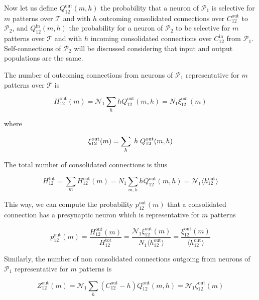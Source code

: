 \documentclass[a4paper, 12pt, twoside, openright]{book}
\newcommand{\popI}{\mathcal{P}_1}
\newcommand{\popII}{\mathcal{P}_2}
\newcommand{\NI}{\mathcal{N}_1}
\newcommand{\T}{\mathcal{T}}
\begin{document}
Now let us define $Q_{12}^\text{out}(m,h)$ the probability that a neuron of $\popI$ is selective for $m$ patterns over $\T$ and with $h$ outcoming consolidated connections over $C_{12}^\text{out}$ to $\popII$, and $Q_{12}^\text{in}(m,h)$ the probability for a neuron of $\popII$ to be selective for $m$ patterns over $\T$ and with $h$ incoming consolidated connections over $C_{12}^\text{in}$ from $\popI$. Self-connections of $\popII$ will be discussed considering that input and output populations are the same.

The number of outcoming connections from neurons of $\popI$ representative for $m$ patterns over $\T$ is

\begin{equation}
     H_{12}^\text{out}(m) = \NI \sum_{h} h Q_{12}^\text{out}(m,h)
     = N_1 \xi_{12}^\text{out} (m) 
\end{equation}

where

\begin{equation}
\xi_{12}^\text{out} (m) = 
 \sum_{h} \hspace{1mm}  h \hspace{1mm} Q_{12}^\text{out}(m,h)
\end{equation}

The total number of consolidated connections is thus

\begin{equation}
     H_{12}^\text{tot} = \sum_{m} H_{12}^\text{out}(m) = N_1 \sum_{m,h} h  Q_{12}^\text{out}(m,h) = \NI \langle h_{12}^\text{out} \rangle
\end{equation}

This way, we can compute the probability $p_{12}^\text{out}(m)$ that a consolidated connection has a presynaptic neuron which is representative for $m$ patterns

\begin{equation}
    p_{12}^\text{out}(m) = \frac{H_{12}^\text{out}(m)}{H_{12}^\text{tot}} =
    \frac{\NI \xi_{12}^\text{out} (m)}{N_1 \langle h_{12}^\text{out} \rangle}= \frac{\xi_{12}^\text{out} (m)}{\langle h_{12}^\text{out} \rangle}
\end{equation}

Similarly, the number of non consolidated connections outgoing from neurons of $\popI$ representative for $m$ patterns is

\begin{equation}
     Z_{12}^\text{out}(m) 
     = \NI \sum_{h}  
     (C_{12}^\text{out} - h) Q_{12}^\text{out}(m,h) 
     = \NI \zeta_{12}^\text{out} (m) 
\end{equation}
\end{document}
